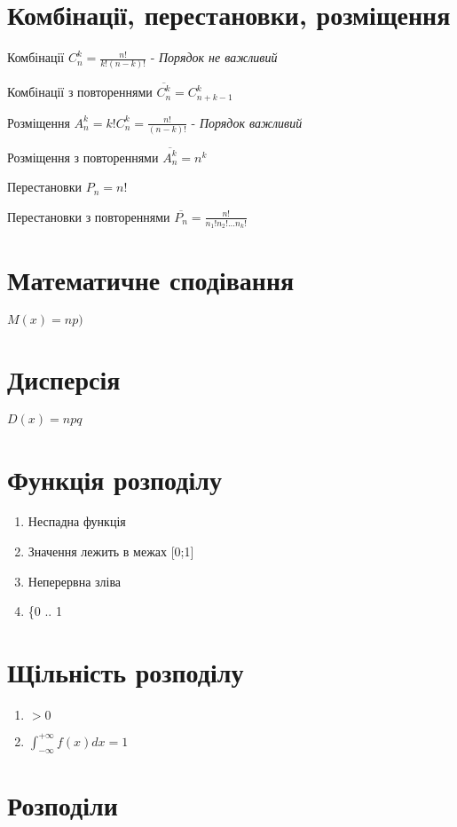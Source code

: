 \documentclass{article}
\begin{document}
\begin{Large}
\section*{Комбінації, перестановки, розміщення}
\begin{list}{-}{}
	\item Комбінації $C_n^k=\frac{n!}{k!(n-k)!}$ - \textit{Порядок не важливий}
	\item Комбінації з повтореннями $\overline{C_n^k}=C_{n+k-1}^k$
	\item Розміщення $A_n^k=k!C_n^k=\frac{n!}{(n-k)!}$ - \textit{Порядок важливий}
	\item Розміщення з повтореннями $\overline{A_n^k}=n^k$
	\item Перестановки $P_n=n!$
	\item Перестановки з повтореннями $\overline{P_n}=\frac{n!}{n_1!n_2!...n_k!}$
\end{list}

\section*{Математичне сподівання}
$M(x)=np)$
\section*{Дисперсія}
$D(x)=npq$

\section*{Функція розподілу}
\begin{enumerate}
	\item Неспадна функція
	\item Значення лежить в межах [0;1]
	\item Неперервна зліва
	\item \{0 .. 1
\end{enumerate}

\section*{Щільність розподілу}
\begin{enumerate}
	\item $> 0$
	\item $\int_{-\infty}^{+\infty}f(x)dx = 1$
\end{enumerate}

\section*{Розподіли}

\end{Large}
\end{document}
